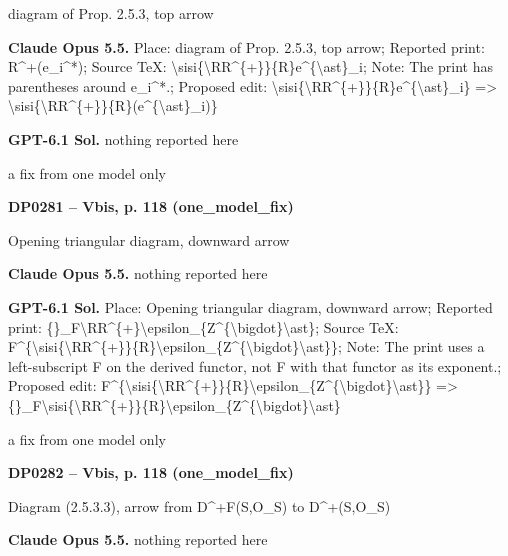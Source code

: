 diagram of Prop. 2.5.3, top arrow\par
\textbf{Claude Opus 5.5.} Place: diagram of Prop. 2.5.3, top arrow; Reported print: R\textasciicircum{}+(e\_i\textasciicircum{}*); Source TeX: \textbackslash{}sisi\{\textbackslash{}RR\textasciicircum{}\{+\}\}\{R\}e\textasciicircum{}\{\textbackslash{}ast\}\_i; Note: The print has parentheses around e\_i\textasciicircum{}*.; Proposed edit: \textbackslash{}sisi\{\textbackslash{}RR\textasciicircum{}\{+\}\}\{R\}e\textasciicircum{}\{\textbackslash{}ast\}\_i\} =\allowbreak > \textbackslash{}sisi\{\textbackslash{}RR\textasciicircum{}\{+\}\}\{R\}(e\textasciicircum{}\{\textbackslash{}ast\}\_i)\}\par
\textbf{GPT-6.1 Sol.} nothing reported here\par
a fix from one model only\par
\par\noindent\hypertarget{DP0281}{}\textbf{DP0281 -- Vbis, p. 118 (one\_model\_fix)}\par
Opening triangular diagram, downward arrow\par
\textbf{Claude Opus 5.5.} nothing reported here\par
\textbf{GPT-6.1 Sol.} Place: Opening triangular diagram, downward arrow; Reported print: \{\}\_F\textbackslash{}RR\textasciicircum{}\{+\}\textbackslash{}epsilon\_\{Z\textasciicircum{}\{\textbackslash{}bigdot\}\textbackslash{}ast\}; Source TeX: F\textasciicircum{}\{\textbackslash{}sisi\{\textbackslash{}RR\textasciicircum{}\{+\}\}\{R\}\textbackslash{}epsilon\_\{Z\textasciicircum{}\{\textbackslash{}bigdot\}\textbackslash{}ast\}\}; Note: The print uses a left-subscript F on the derived functor, not F with that functor as its exponent.; Proposed edit: F\textasciicircum{}\{\textbackslash{}sisi\{\textbackslash{}RR\textasciicircum{}\{+\}\}\{R\}\textbackslash{}epsilon\_\{Z\textasciicircum{}\{\textbackslash{}bigdot\}\textbackslash{}ast\}\} =\allowbreak > \{\}\_F\textbackslash{}sisi\{\textbackslash{}RR\textasciicircum{}\{+\}\}\{R\}\textbackslash{}epsilon\_\{Z\textasciicircum{}\{\textbackslash{}bigdot\}\textbackslash{}ast\}\par
a fix from one model only\par
\par\noindent\hypertarget{DP0282}{}\textbf{DP0282 -- Vbis, p. 118 (one\_model\_fix)}\par
Diagram (2.5.3.3), arrow from D\textasciicircum{}+F(S,O\_S) to D\textasciicircum{}+(S,O\_S)\par
\textbf{Claude Opus 5.5.} nothing reported here\par
